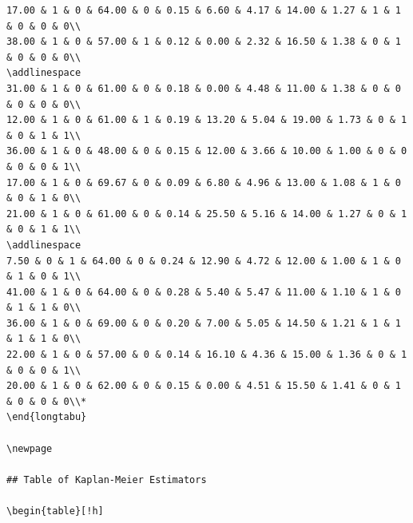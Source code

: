 \documentclass[
]{article}
\begin{document}
\begin{verbatim}
17.00 & 1 & 0 & 64.00 & 0 & 0.15 & 6.60 & 4.17 & 14.00 & 1.27 & 1 & 1 & 0 & 0 & 0\\
38.00 & 1 & 0 & 57.00 & 1 & 0.12 & 0.00 & 2.32 & 16.50 & 1.38 & 0 & 1 & 0 & 0 & 0\\
\addlinespace
31.00 & 1 & 0 & 61.00 & 0 & 0.18 & 0.00 & 4.48 & 11.00 & 1.38 & 0 & 0 & 0 & 0 & 0\\
12.00 & 1 & 0 & 61.00 & 1 & 0.19 & 13.20 & 5.04 & 19.00 & 1.73 & 0 & 1 & 0 & 1 & 1\\
36.00 & 1 & 0 & 48.00 & 0 & 0.15 & 12.00 & 3.66 & 10.00 & 1.00 & 0 & 0 & 0 & 0 & 1\\
17.00 & 1 & 0 & 69.67 & 0 & 0.09 & 6.80 & 4.96 & 13.00 & 1.08 & 1 & 0 & 0 & 1 & 0\\
21.00 & 1 & 0 & 61.00 & 0 & 0.14 & 25.50 & 5.16 & 14.00 & 1.27 & 0 & 1 & 0 & 1 & 1\\
\addlinespace
7.50 & 0 & 1 & 64.00 & 0 & 0.24 & 12.90 & 4.72 & 12.00 & 1.00 & 1 & 0 & 1 & 0 & 1\\
41.00 & 1 & 0 & 64.00 & 0 & 0.28 & 5.40 & 5.47 & 11.00 & 1.10 & 1 & 0 & 1 & 1 & 0\\
36.00 & 1 & 0 & 69.00 & 0 & 0.20 & 7.00 & 5.05 & 14.50 & 1.21 & 1 & 1 & 1 & 1 & 0\\
22.00 & 1 & 0 & 57.00 & 0 & 0.14 & 16.10 & 4.36 & 15.00 & 1.36 & 0 & 1 & 0 & 0 & 1\\
20.00 & 1 & 0 & 62.00 & 0 & 0.15 & 0.00 & 4.51 & 15.50 & 1.41 & 0 & 1 & 0 & 0 & 0\\*
\end{longtabu}

\newpage

## Table of Kaplan-Meier Estimators

\begin{table}[!h]


\end{verbatim}
\end{document}
